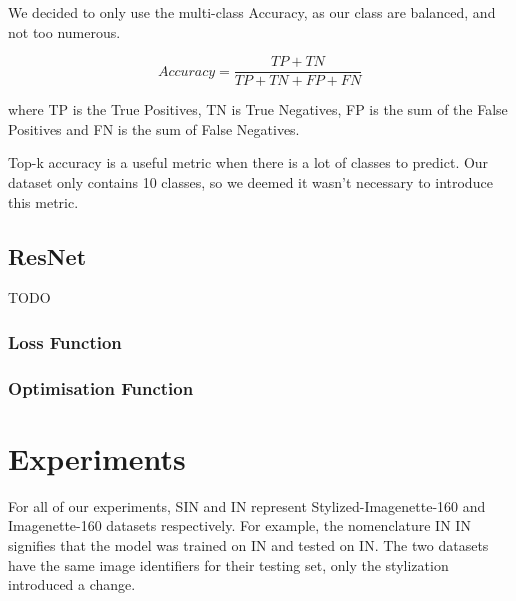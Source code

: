 \documentclass{article}
\begin{document}
We decided to only use the multi-class Accuracy, as our class are balanced, and not too numerous. \medskip \par

$$ Accuracy = \frac{TP + TN}{TP + TN + FP + FN}  $$ \medskip \par

\noindent
where TP is the True Positives, TN is True Negatives, FP is the sum of the False Positives
and FN is the sum of False Negatives. \medskip \par

\noindent
Top-k accuracy is a useful metric when there is a lot of classes to predict. Our dataset only
contains 10 classes, so we deemed it wasn't necessary to introduce this metric.

\subsection{ResNet}

TODO

\subsubsection{Loss Function} %

\subsubsection{Optimisation Function}






\newpage
\section{Experiments}

For all of our experiments, SIN and IN represent Stylized-Imagenette-160 and Imagenette-160 datasets respectively.
For example, the nomenclature IN \texorpdfstring{\textrightarrow} .IN signifies that the 
model was trained on IN and tested on IN.
The two datasets have the same image identifiers for their testing set, only the stylization introduced a change.
\end{document}
